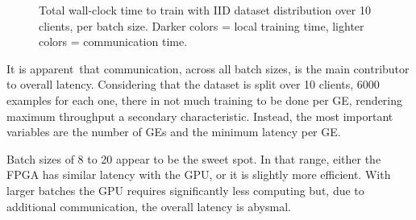 \begin{figure}[H]
    
    \caption[ IID distribution, total time per GE ]{ Total wall-clock time to train with IID dataset distribution over 10 clients, per batch size. Darker colors = local training time, lighter colors = communication time. }
    \label{fig: IID, total time}
\end{figure}

It is apparent that communication, across all batch sizes, is the main contributor to overall latency. Considering that the dataset is split over 10 clients, 6000 examples for each one, there in not much training to be done per GE, rendering maximum throughput a secondary characteristic. Instead, the most important variables are the number of GEs and the minimum latency per GE. %

Batch sizes of 8 to 20 appear to be the sweet spot. In that range, either the FPGA has similar latency with the GPU, or it is slightly more efficient. With larger batches the GPU requires significantly less computing but, due to additional communication, the overall latency is abysmal. %


